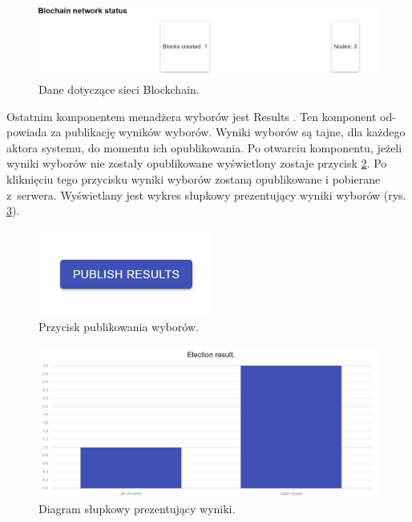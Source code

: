 \documentclass[a4paper,12pt]{book}
\begin{document}
\begin{figure}[H]
	\centering
	\includegraphics[width=\textwidth]{images/bcstatus.png}
	\caption{Dane dotyczące sieci Blockchain.}\label{bcstatus}
\end {figure}

Ostatnim komponentem menadżera wyborów jest
Results
. Ten komponent od-
powiada za publikację wyników wyborów. Wyniki wyborów są tajne, dla każdego
aktora systemu, do momentu ich opublikowania. Po otwarciu komponentu, jeżeli
wyniki wyborów nie zostały opublikowane wyświetlony zostaje przycisk \ref{publish}. Po
kliknięciu tego przycisku wyniki wyborów zostaną opublikowane i pobierane z~serwera. Wyświetlany jest wykres słupkowy prezentujący wyniki wyborów (rys.
\ref{adminelectionresult}).

\begin{figure}[H]
	\centering
	\includegraphics{images/publish.png}
	\caption{Przycisk publikowania wyborów.}\label{publish}
\end {figure}

\begin{figure}[H]
	\centering
	\includegraphics[width=\textwidth]{images/adminelectionresult.png}
	\caption{Diagram słupkowy prezentujący wyniki.}\label{adminelectionresult}
\end {figure}
\newpage
\end{document}
